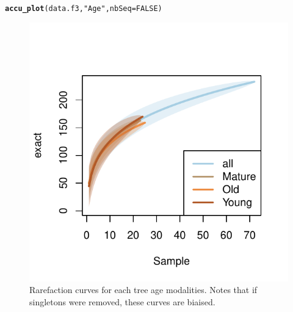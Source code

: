 \documentclass[12pt]{article}\usepackage[]{graphicx}\usepackage[]{color}
\makeatletter
\def\maxwidth{ %
  \ifdim\Gin@nat@width>\linewidth
    \linewidth
  \else
    \Gin@nat@width
  \fi
}
\newcommand{\hlnum}[1]{\textcolor[rgb]{0.686,0.059,0.569}{#1}}%
\newcommand{\hlstr}[1]{\textcolor[rgb]{0.192,0.494,0.8}{#1}}%
\newcommand{\hlstd}[1]{\textcolor[rgb]{0.345,0.345,0.345}{#1}}%
\newcommand{\hlkwc}[1]{\textcolor[rgb]{0.333,0.667,0.333}{#1}}%
\newcommand{\hlkwd}[1]{\textcolor[rgb]{0.737,0.353,0.396}{\textbf{#1}}}%
\newenvironment{kframe}{%
 \def\at@end@of@kframe{}%
 \ifinner\ifhmode%
  \def\at@end@of@kframe{\end{minipage}}%
  \begin{minipage}{\columnwidth}%
 \fi\fi%
 \def\FrameCommand##1{\hskip\@totalleftmargin \hskip-\fboxsep
 \colorbox{shadecolor}{##1}\hskip-\fboxsep
     \hskip-\linewidth \hskip-\@totalleftmargin \hskip\columnwidth}%
 \MakeFramed {\advance\hsize-\width
   \@totalleftmargin\z@ \linewidth\hsize
   \@setminipage}}%
 {\par\unskip\endMakeFramed%
 \at@end@of@kframe}
\newenvironment{knitrout}{}{} %
\numberwithin{figure}{section}
\makeatother
\begin{document}
\begin{knitrout}\small
{}\color{fgcolor}\begin{kframe}
\begin{alltt}
\hlkwd{accu_plot}\hlstd{(data.f3,} \hlstr{"Age"}\hlstd{,} \hlkwc{nbSeq} \hlstd{=} \hlnum{FALSE}\hlstd{)}
\end{alltt}
\end{kframe}\begin{figure}

{\centering \includegraphics[width=\maxwidth]{figure/unnamed-chunk-38-1} 

}

\caption[Rarefaction curves for each tree age modalities]{Rarefaction curves for each tree age modalities. Notes that if singletons were removed, these curves are biaised.}\label{fig:unnamed-chunk-38}
\end{figure}


\end{knitrout}
  
\end{document}
